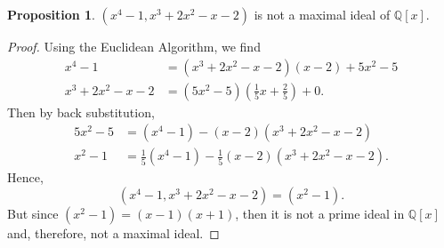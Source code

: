 \documentclass[12pt]{article}
\theoremstyle{definition}
\newtheorem{proposition}{Proposition}
\newcommand{\Q}{\mathbb{Q}}
\begin{document}
\begin{proposition}
    $(x^4 - 1, x^3 + 2x^2 - x - 2)$ is not a maximal ideal of $\Q[x]$.
\end{proposition}

\begin{proof}
    Using the Euclidean Algorithm, we find
    \begin{align*}
        x^4 - 1 &= (x^3 + 2x^2 - x - 2)(x - 2) + 5x^2 - 5 \\
        x^3 + 2x^2 - x - 2 &= (5x^2 - 5)\left(\tfrac{1}{5} x + \tfrac{2}{5}\right) + 0.
    \end{align*}
    Then by back substitution,
    \begin{align*}
        5x^2 - 5 &= (x^4 - 1) - (x - 2)(x^3 + 2x^2 - x - 2) \\
        x^2 - 1 &= \tfrac15(x^4 - 1) - \tfrac15(x - 2)(x^3 + 2x^2 - x - 2).
    \end{align*}
    Hence,
    \[
        (x^4 - 1, x^3 + 2x^2 - x - 2) = (x^2 - 1).
    \]
    But since $(x^2 - 1) = (x - 1)(x + 1)$, then it is not a prime ideal in $\Q[x]$ and, therefore, not a maximal ideal.
    
\end{proof}
\end{document}
